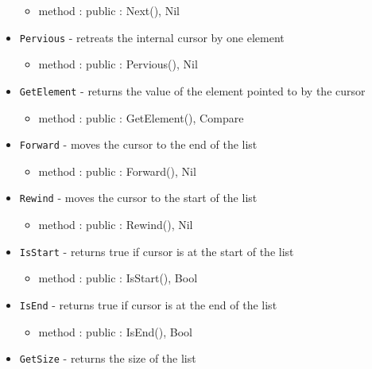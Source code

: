 \documentclass[12pt]{article}
\begin{document}
\begin{itemize}
\begin{itemize}
	\item method : public : Next(), Nil
	\end{itemize}
    \item \texttt{Pervious} - retreats the internal cursor by one element
    	\begin{itemize}
	\item method : public : Pervious(), Nil
	\end{itemize}
    \item \texttt{GetElement} - returns the value of the element  pointed to by the cursor
    	\begin{itemize}
	\item method : public : GetElement(), Compare
	\end{itemize}
    \item \texttt{Forward} - moves the cursor to the end of the list
    	\begin{itemize}
	\item method : public : Forward(), Nil
	\end{itemize}
    \item \texttt{Rewind} - moves the cursor to the start of the list
    	\begin{itemize}
	\item method : public : Rewind(), Nil
	\end{itemize}
    \item \texttt{IsStart} - returns true if cursor is at the start of the list
    	\begin{itemize}
	\item method : public : IsStart(), Bool
	\end{itemize}
    \item \texttt{IsEnd} - returns true if cursor is at the end of the list
    	\begin{itemize}
	\item method : public : IsEnd(), Bool
	\end{itemize}		
    \item \texttt{GetSize} - returns the size of the list
\end{itemize}
\end{document}
